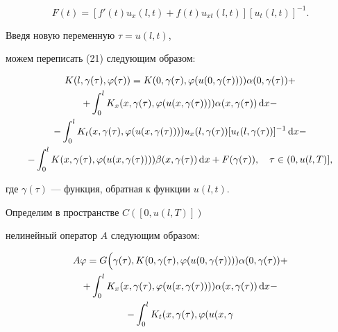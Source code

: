 \begin{pf}
\begin{equation}
F(t)=[ f'(t)u_x(l,t)+f(t)u_{xt}(l,t)] [u_t(l,t)]^{-1}.




\end{equation}


Введя новую переменную $\tau =u(l,t)$,


можем переписать (21) следующим образом:


\begin{multline}


K(l,\gamma (\tau ),\varphi (\tau ))=K(0,\gamma (\tau


),\varphi (u(0,\gamma


(\tau ))))\alpha (0,\gamma (\tau))+\\


+\int_0^lK_x(x,\gamma (\tau ),\varphi


(u(x,\gamma (\tau ))))\alpha (x,\gamma (\tau ))\d x-\\


-\int_0^lK_t(x,\gamma (\tau ),\varphi (u(x,\gamma


(\tau ))))


u_x(l,\gamma (\tau ))[u_t(l,\gamma (\tau ))]^{-1}\d x-\\


- \int_0^lK(x,\gamma (\tau ),\varphi


(u(x,\gamma (\tau ))))\beta (x,\gamma (\tau ))\d


x+F(\gamma (\tau )),\q \tau \in ( 0,u(l,T)],




\end{multline}


где $\gamma (\tau)$ --- функция, обратная к функции $u(l,t)$.





Определим в пространстве $C([0,u(l,T)])$


нелинейный оператор $A$ следующим образом:


\begin{multline}


A\varphi = G\Big(\gamma (\tau ),K(0,\gamma (\tau ),


\varphi (u(0,\gamma (\tau))))\alpha (0,\gamma (\tau))+\\


+ \int_0^lK_x(x,\gamma (\tau ),\varphi (u(x,\gamma(\tau))))


\alpha (x,\gamma(\tau ))\d x-\\


-\int_0^lK_t(x,\gamma (\tau ),\varphi (u(x,\gamma



\end{multline}
\end{pf}

